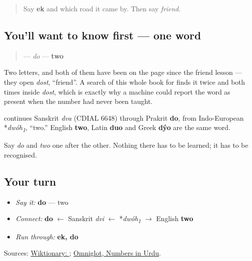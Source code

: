 \begin{quote}
Say \textbf{ek} and which road it came by. Then say \emph{friend}.
\end{quote}

\subsection*{You'll want to know first — one word}
\begin{quote}
\textbf{} — \emph{do} — \textbf{two}
\end{quote}

Two letters, and both of them have been on the page since the friend lesson — they open \emph{dost}, \textquotedblleft{}friend\textquotedblright{}. A search of this whole book for \textbf{} finds it twice and both times inside \emph{dost}, which is exactly why a machine could report the word as present when the number had never been taught.

\begin{cousinweb}
\textbf{} continues Sanskrit \emph{dva} (CDIAL 6648) through Prakrit \textbf{do}, from Indo-European *\emph{dwóh\textsubscript{1}}, \textquotedblleft{}two.\textquotedblright{} English \textbf{two}, Latin \textbf{duo} and Greek \textbf{dýo} are the same word.

Say \emph{do} and \emph{two} one after the other. Nothing there has to be learned; it has to be recognised.
\end{cousinweb}

\subsection*{Your turn}
\begin{itemize}
\raggedright
  \item \emph{Say it:} \textbf{do} — two
  \item \emph{Connect:} \textbf{do} $\leftarrow$ Sanskrit \emph{dvi} $\leftarrow$ *\emph{dwóh\textsubscript{1}} $\to$ English \textbf{two}
  \item \emph{Run through:} \textbf{ek, do}
\end{itemize}

\begin{tcolorbox}[breakable,colback=teal!4,colframe=teal!35!black,title={Before you move on}]
Sources: \href{https://en.wiktionary.org/wiki/\%D8\%AF\%D9\%88}{Wiktionary: }; \href{https://www.omniglot.com/language/numbers/urdu.htm}{Omniglot, Numbers in Urdu}.
\end{tcolorbox}

